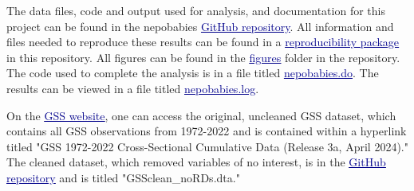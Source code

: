 \documentclass[12pt]{article}
\begin{document}
\newcommand{\hrefunderline}[2]{\href{#1}{\textcolor{darkblue}{\uline{#2}}}}


\hypersetup{
    linkcolor=darkblue,    %
    citecolor=darkblue,    %
    filecolor=darkblue,    %
    urlcolor=darkblue      %
}

The data files, code and output used for analysis, and documentation for this project can be found in the nepobabies \hrefunderline{https://github.com/ecn310/course-project-nepobabies}{GitHub repository}. All information and files needed to reproduce these results can be found in a 
\hrefunderline{https://github.com/ecn310/course-project-nepobabies/blob/main/Final\%20Report/ReproducibilityPackage.md}{reproducibility package}
in this repository. All figures can be found in the 
\hrefunderline{https://github.com/ecn310/course-project-nepobabies/tree/main/Final\%20Report/figures}{figures} 
folder in the repository. The code used to complete the analysis is in a file titled \hrefunderline{https://github.com/ecn310/course-project-nepobabies/blob/main/DoFiles/nepobabies.do}{nepobabies.do}. The results can be viewed in a file titled \hrefunderline{https://github.com/ecn310/course-project-nepobabies/blob/main/DoFiles/nepobabies.log}{nepobabies.log}.

On the \hrefunderline{https://gss.norc.org/get-the-data/stata}{GSS website}, one can access the original, uncleaned GSS dataset, which contains all GSS observations from 1972-2022 and is contained within a hyperlink titled "GSS 1972-2022 Cross-Sectional Cumulative Data (Release 3a, April 2024)." The cleaned dataset, which removed variables of no interest, is in the \hrefunderline{https://github.com/ecn310/course-project-nepobabies/tree/main/Data/Last.Step.Data}{GitHub repository} and is titled "GSSclean\_noRDs.dta."
\end{document}
